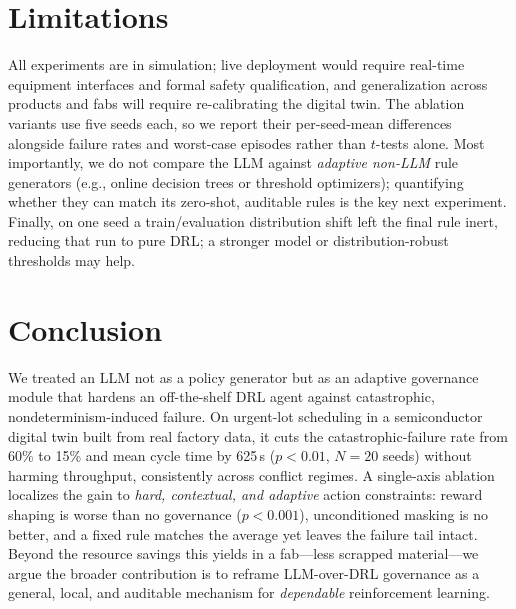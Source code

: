\documentclass[letterpaper]{article} %
\begin{document}
\section{Limitations}
\label{sec:limitations}

All experiments are in simulation; live deployment would require real-time
equipment interfaces and formal safety qualification, and generalization across
products and fabs will require re-calibrating the digital twin. The ablation
variants use five seeds each, so we report their per-seed-mean differences
alongside failure rates and worst-case episodes rather than $t$-tests alone. Most
importantly, we do not compare the LLM against \emph{adaptive non-LLM} rule
generators (e.g., online decision trees or threshold optimizers); quantifying
whether they can match its zero-shot, auditable rules is the key next experiment.
Finally, on one seed a train/evaluation distribution shift left the final rule
inert, reducing that run to pure DRL; a stronger model or distribution-robust
thresholds may help.

\section{Conclusion}

We treated an LLM not as a policy generator but as an adaptive governance module
that hardens an off-the-shelf DRL agent against catastrophic,
nondeterminism-induced failure. On urgent-lot scheduling in a semiconductor
digital twin built from real factory data, it cuts the catastrophic-failure rate
from 60\% to 15\% and mean cycle time by 625\,s ($p<0.01$, $N{=}20$ seeds)
without harming throughput, consistently across conflict regimes. A single-axis
ablation localizes the gain to \emph{hard, contextual, and adaptive} action
constraints: reward shaping is worse than no governance ($p<0.001$),
unconditioned masking is no better, and a fixed rule matches the average yet
leaves the failure tail intact. Beyond the resource savings this yields in a
fab---less scrapped material---we argue the broader contribution is to reframe
LLM-over-DRL governance as a general, local, and auditable mechanism for
\emph{dependable} reinforcement learning.


\end{document}
